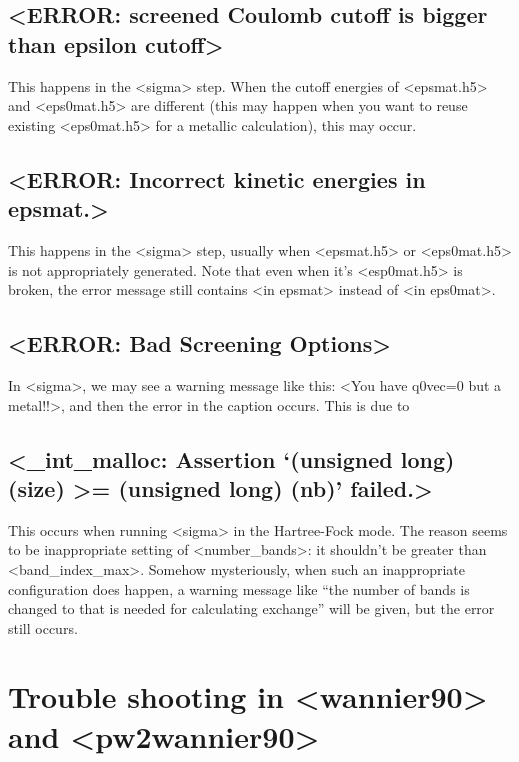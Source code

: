 \documentclass[hyperref, a4paper, 12pt]{report}
\def\texttt#1{<#1>}%
\newcommand{\shortcode}[1]{\texttt{#1}}
\begin{document}
\subsection{\shortcode{ERROR: screened Coulomb cutoff is bigger than epsilon cutoff}}

This happens in the \shortcode{sigma} step.
When the cutoff energies of \shortcode{epsmat.h5} and \shortcode{eps0mat.h5} 
are different 
(this may happen when you want to reuse existing \shortcode{eps0mat.h5} for a metallic calculation),
this may occur. 

\subsection{\shortcode{ERROR: Incorrect kinetic energies in epsmat.}}

This happens in the \shortcode{sigma} step, 
usually when \shortcode{epsmat.h5} or \shortcode{eps0mat.h5} 
is not appropriately generated. 
Note that even when it's \shortcode{esp0mat.h5} is broken, 
the error message still contains \shortcode{in epsmat}
instead of \shortcode{in eps0mat}.

\subsection{\shortcode{ERROR: Bad Screening Options}}

In \shortcode{sigma}, we may see a warning message like this:
\shortcode{You have q0vec=0 but a metal!!},
and then the error in the caption occurs. 
This is due to 

\subsection{\shortcode{_int_malloc: Assertion `(unsigned long) (size) >= (unsigned long) (nb)' failed.}}

This occurs when running \shortcode{sigma} 
in the Hartree-Fock mode.
The reason seems to be inappropriate setting of \shortcode{number_bands}:
it shouldn't be greater than \shortcode{band_index_max}.
Somehow mysteriously,
when such an inappropriate configuration does happen,
a warning message like ``the number of bands is changed to 
that is needed for calculating exchange''
will be given,
but the error still occurs.



\section{Trouble shooting in \shortcode{wannier90} and \shortcode{pw2wannier90}}
\end{document}
